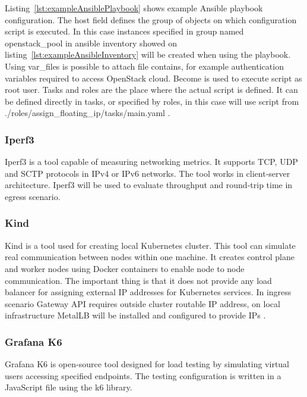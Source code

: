 Listing~\ref{lst:exampleAnsiblePlaybook} shows example Ansible playbook configuration. The host field defines the group of objects on which configuration script is executed. In this case instances specified in group named openstack\_pool in ansible inventory showed on listing~\ref{lst:exampleAnsibleInventory} will be created when using the playbook. Using var\_files is possible to attach file contains, for example authentication variables required to access OpenStack cloud. Become is used to execute script as root user. Tasks and roles are the place where the actual script is defined. It can be defined directly in tasks, or specified by roles, in this case will use script from ./roles/assign\_floating\_ip/tasks/main.yaml \cite{AnsiblePlaybook}.


\subsubsection{Iperf3}
\label{sec:iperf3}

Iperf3 is a tool capable of measuring networking metrics. It supports TCP, UDP and SCTP protocols in IPv4 or IPv6 networks. The tool works in client-server architecture. Iperf3 will be used to evaluate throughput and round-trip time in egress scenario.

\subsubsection{Kind}
\label{sec:kind}

Kind is a tool used for creating local Kubernetes cluster. This tool can simulate real communication between nodes within one machine. It creates control plane and worker nodes using Docker containers to enable node to node communication. The important thing is that it does not provide any load balancer for assigning external IP addresses for Kubernetes services. In ingress scenario Gateway API requires outside cluster routable IP address, on local infrastructure MetalLB will be installed and configured to provide IPs \cite{Kind}.

\subsubsection{Grafana K6}
\label{sec:grafana}

Grafana K6 is open-source tool designed for load testing by simulating virtual users accessing specified endpoints. The testing configuration is written in a JavaScript file using the k6 library.

